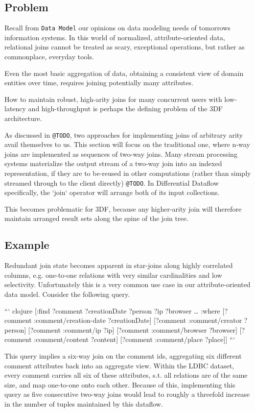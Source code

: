 \documentclass[../catalog.tex]{subfiles}
\begin{document}
\subsection{Problem}

Recall from \texttt{Data Model} our opinions on data modeling needs of
tomorrows information systems. In this world of normalized,
attribute-oriented data, relational joins cannot be treated as scary,
exceptional operations, but rather as commonplace, everyday tools.

Even the most basic aggregation of data, obtaining a consistent view
of domain entities over time, requires joining potentially many
attributes.

How to maintain robust, high-arity joins for many concurrent users
with low-latency and high-throughput is perhaps the defining problem
of the 3DF architecture.

As discussed in \texttt{@TODO}, two approaches for implementing joins of
arbitrary arity avail themselves to us. This section will focus on the
traditional one, where n-way joins are implemented as sequences of
two-way joins. Many stream processing systems materialize the output
stream of a two-way join into an indexed representation, if they are
to be-reused in other computations (rather than simply streamed
through to the client directly) \texttt{@TODO}. In Differential Dataflow
specifically, the `join` operator will arrange both of its input
collections.

This becomes problematic for 3DF, because any higher-arity join will
therefore maintain arranged result sets along the spine of the join
tree.

\subsection{Example}

Redundant join state becomes apparent in star-joins along highly
correlated columns, e.g. one-to-one relations with very similar
cardinalities and low selectivity. Unfortunately this is a very common
use case in our attribute-oriented data model. Consider the following
query.

``` clojure
[:find ?comment ?creationDate ?person ?ip ?browser \ldots{}
 :where
 [?comment :comment/creation-date ?creationDate]
 [?comment :comment/creator ?person]
 [?comment :comment/ip ?ip]
 [?comment :comment/browser ?browser]
 [?comment :comment/content ?content]
 [?comment :comment/place ?place]]
```

This query implies a six-way join on the comment ids, aggregating six
different comment attributes back into an aggregate view. Within the
LDBC dataset, every comment carries all six of these attributes,
s.t. all relations are of the same size, and map one-to-one onto each
other. Because of this, implementing this query as five consecutive
two-way joins would lead to roughly a threefold increase in the number
of tuples maintained by this dataflow.
\end{document}
